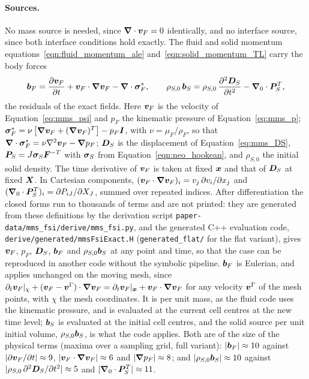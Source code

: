 \paragraph{Sources.}
No mass source is needed, since $\boldsymbol{\nabla}\cdot\boldsymbol{v}_F = 0$ identically, and no interface source, since both interface conditions hold exactly.
The fluid and solid momentum equations~\eqref{eqn:fluid_momentum_ale} and~\eqref{eqn:solid_momentum_TL} carry the body forces
\begin{equation}
	\boldsymbol{b}_F = \frac{\partial\boldsymbol{v}_F}{\partial t} + \boldsymbol{v}_F\cdot\boldsymbol{\nabla}\boldsymbol{v}_F - \boldsymbol{\nabla}\cdot\boldsymbol{\sigma}_F^*, \qquad
	\rho_{S,0}\,\boldsymbol{b}_S = \rho_{S,0}\,\frac{\partial^2\boldsymbol{D}_S}{\partial t^2} - \boldsymbol{\nabla}_0\cdot\boldsymbol{P}_S^T ,
	\label{eq:mms_sources}
\end{equation}
the residuals of the exact fields.
Here $\boldsymbol{v}_F$ is the velocity of Equation~\eqref{eq:mms_psi} and $p_F$ the kinematic pressure of Equation~\eqref{eq:mms_p}; $\boldsymbol{\sigma}_F^* = \nu\left[\boldsymbol{\nabla}\boldsymbol{v}_F + (\boldsymbol{\nabla}\boldsymbol{v}_F)^T\right] - p_F\boldsymbol{I}$, with $\nu = \mu_F/\rho_F$, so that $\boldsymbol{\nabla}\cdot\boldsymbol{\sigma}_F^* = \nu\nabla^2\boldsymbol{v}_F - \boldsymbol{\nabla}p_F$; $\boldsymbol{D}_S$ is the displacement of Equation~\eqref{eq:mms_DS}, $\boldsymbol{P}_S = J\boldsymbol{\sigma}_S\boldsymbol{F}^{-T}$ with $\boldsymbol{\sigma}_S$ from Equation~\eqref{eqn:neo_hookean}, and $\rho_{S,0}$ the initial solid density.
The time derivative of $\boldsymbol{v}_F$ is taken at fixed $\boldsymbol{x}$ and that of $\boldsymbol{D}_S$ at fixed $\boldsymbol{X}$.
In Cartesian components, $(\boldsymbol{v}_F\cdot\boldsymbol{\nabla}\boldsymbol{v}_F)_i = v_j\,\partial v_i/\partial x_j$ and $(\boldsymbol{\nabla}_0\cdot\boldsymbol{P}_S^T)_i = \partial P_{iJ}/\partial X_J$, summed over repeated indices.
After differentiation the closed forms run to thousands of terms and are not printed: they are generated from these definitions by the derivation script \texttt{paper-data/mms\_fsi/derive/mms\_fsi.py}, and the generated C++ evaluation code, \texttt{derive/generated/mmsFsiExact.H} (\texttt{generated\_flat/} for the flat variant), gives $\boldsymbol{v}_F$, $p_F$, $\boldsymbol{D}_S$, $\boldsymbol{b}_F$ and $\rho_{S,0}\boldsymbol{b}_S$ at any point and time, so that the case can be reproduced in another code without the symbolic pipeline.
$\boldsymbol{b}_F$ is Eulerian, and applies unchanged on the moving mesh, since $\partial_t\boldsymbol{v}_F|_{\chi} + (\boldsymbol{v}_F - \boldsymbol{v}^\Gamma)\cdot\boldsymbol{\nabla}\boldsymbol{v}_F = \partial_t\boldsymbol{v}_F|_{\boldsymbol{x}} + \boldsymbol{v}_F\cdot\boldsymbol{\nabla}\boldsymbol{v}_F$ for any velocity $\boldsymbol{v}^\Gamma$ of the mesh points, with $\chi$ the mesh coordinates.
It is per unit mass, as the fluid code uses the kinematic pressure, and is evaluated at the current cell centres at the new time level; $\boldsymbol{b}_S$ is evaluated at the initial cell centres, and the solid source per unit initial volume, $\rho_{S,0}\boldsymbol{b}_S$, is what the code applies.
Both are of the size of the physical terms (maxima over a sampling grid, full variant): $|\boldsymbol{b}_F| \approx 10$ against $|\partial\boldsymbol{v}_F/\partial t| \approx 9$, $|\boldsymbol{v}_F\cdot\boldsymbol{\nabla}\boldsymbol{v}_F| \approx 6$ and $|\boldsymbol{\nabla}p_F| \approx 8$; and $|\rho_{S,0}\boldsymbol{b}_S| \approx 10$ against $|\rho_{S,0}\,\partial^2\boldsymbol{D}_S/\partial t^2| \approx 5$ and $|\boldsymbol{\nabla}_0\cdot\boldsymbol{P}_S^T| \approx 11$.

